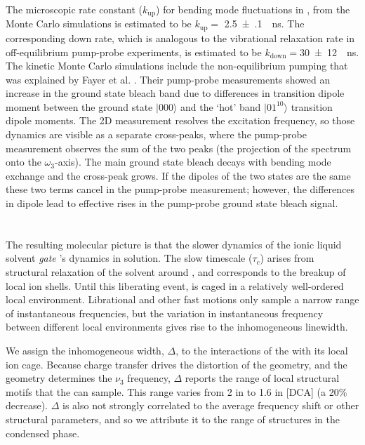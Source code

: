 {The microscopic rate constant ($k_{\mathrm{up}}$) for  bending mode fluctuations in \ce{[Im_{4,1}][TfO]}, from the Monte Carlo simulations is estimated to be $k_{\mathrm{up}} =$ \SI{2.5(1)}{\per\ns}. The corresponding down rate, which is analogous to the vibrational relaxation rate in off-equilibrium pump-probe experiments, is estimated to be $k_{\mathrm{down}} =$\SI{30(12)}{\per\ns}. The kinetic Monte Carlo simulations include the non-equilibrium pumping that was explained by Fayer et al. \cite{Giammanco2016}. Their pump-probe measurements showed an increase in the ground state bleach band due to differences in transition dipole moment between the ground state $|000\rangle$ and the `hot' band $|01^10\rangle$ transition dipole moments. The 2D measurement resolves the excitation frequency, so those dynamics are visible as a separate cross-peaks, where the pump-probe measurement observes the sum of the two peaks (the projection of the spectrum onto the \(\omega_3\)-axis). The main ground state bleach decays with bending mode exchange and the cross-peak grows. If the dipoles of the two states are the same these two terms cancel in the pump-probe measurement; however, the differences in dipole lead to effective rises in the pump-probe ground state bleach signal.

\section{\texorpdfstring{}{Molecular Interpretation}}
\label{sec:anions_interpretation}

The resulting molecular picture is that the slower dynamics of the ionic liquid solvent \textit{gate} 's dynamics in solution. The slow timescale (\(\tau_c\)) arises from structural relaxation of the solvent around , and corresponds to the breakup of local ion shells. Until this liberating event,  is caged in a relatively well-ordered local environment. Librational and other fast motions only sample a narrow range of instantaneous frequencies, but the variation in instantaneous frequency between different local environments gives rise to the inhomogeneous linewidth.

We assign the inhomogeneous width, \(\Delta\), to the interactions of the  with its local ion cage. Because charge transfer drives the distortion of the  geometry, and the geometry determines the \(\nu_3\) frequency, \(\Delta\) reports the range of local structural motifs that the  can sample.
This range varies from \SI{2}{\wavenumber} in \ce{[PF6]} to \SI{1.6}{\wavenumber} in [DCA]  (a 20\% decrease). \(\Delta\) is also not strongly correlated to the average frequency shift or other structural parameters, and so we attribute it to the range of structures in the condensed phase.

}
